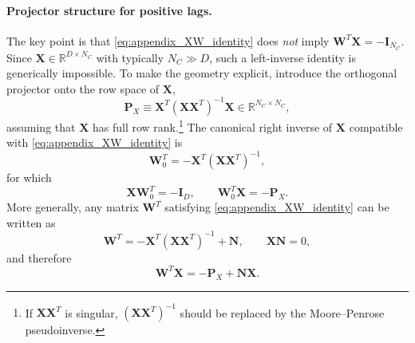 \documentclass[%
  prl,
  reprint,
  amsmath,
  amssymb,
  aps
]{revtex4-2}
\begin{document}
\paragraph{Projector structure for positive lags.}
The key point is that \eqref{eq:appendix_XW_identity} does \emph{not} imply $\bm{W}^T\bm{X}=-\bm{I}_{N_C}$. Since $\bm{X}\in\mathbb{R}^{D\times N_C}$ with typically $N_C\gg D$, such a left-inverse identity is generically impossible. To make the geometry explicit, introduce the orthogonal projector onto the row space of $\bm{X}$,
\begin{equation}
    \bm{P}_X
    \equiv
    \bm{X}^T(\bm{X}\bm{X}^T)^{-1}\bm{X}
    \in \mathbb{R}^{N_C\times N_C},
\label{eq:appendix_projector}
\end{equation}
assuming that $\bm{X}$ has full row rank.\footnote{If $\bm{X}\bm{X}^T$ is singular, $(\bm{X}\bm{X}^T)^{-1}$ should be replaced by the Moore--Penrose pseudoinverse.}
The canonical right inverse of $\bm{X}$ compatible with \eqref{eq:appendix_XW_identity} is
\begin{equation}
    \bm{W}_0^T
    =
    -\bm{X}^T(\bm{X}\bm{X}^T)^{-1},
\end{equation}
for which
\begin{equation}
    \bm{X}\bm{W}_0^T=-\bm{I}_D,
    \qquad
    \bm{W}_0^T\bm{X}=-\bm{P}_X.
\end{equation}
More generally, any matrix $\bm{W}^T$ satisfying \eqref{eq:appendix_XW_identity} can be written as
\begin{equation}
    \bm{W}^T
    =
    -\bm{X}^T(\bm{X}\bm{X}^T)^{-1}
    + \bm{N},
    \qquad
    \bm{X}\bm{N}=0,
\label{eq:appendix_W_decomposition}
\end{equation}
and therefore
\begin{equation}
    \bm{W}^T\bm{X}
    =
    -\bm{P}_X+\bm{N}\bm{X}.
\label{eq:appendix_WX_decomposition}
\end{equation}
\end{document}
